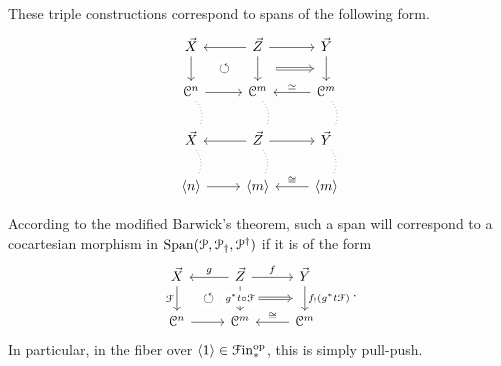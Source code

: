 \documentclass[main.tex]{subfiles}
\begin{document}
These triple constructions correspond to spans of the following form.
\begin{equation*}
  \begin{tikzcd}
    \vec{X}
    \arrow[d, ""{name=L, right}]
    & \vec{Z}
    \arrow[d, ""{name=ML, left}, ""{name=MR, right}]
    \arrow[r]
    \arrow[l]
    & \vec{Y}
    \arrow[d, ""{name=R, right}]
    \\
    \category{C}^{n}
    \arrow[d, no head, dotted, bend left]
    \arrow[r]
    & \category{C}^{m}
    \arrow[d, no head, dotted, bend left]
    & \category{C}^{m}
    \arrow[l, swap, "\simeq"]
    \arrow[d, no head, dotted, bend left]
    \\
    \vec{X}
    \arrow[d, no head, dotted, bend left]
    & \vec{Z}
    \arrow[d, no head, dotted, bend left]
    \arrow[r]
    \arrow[l]
    & \vec{Y}
    \arrow[d, no head, dotted, bend left]
    \\
    \langle n \rangle
    \arrow[r]
    & \langle m \rangle
    & \langle m \rangle
    \arrow[l, swap, "\cong"]
    \arrow[from=ML, to=L, phantom, shorten=1.5ex, "\circlearrowleft"{description}]
    \arrow[from=MR, to=R, Rightarrow, shorten=2ex]
  \end{tikzcd}
\end{equation*}

According to the modified Barwick's theorem, such a span will correspond to a cocartesian morphism in $\mathrm{Span}(\mathcal{P}, \mathcal{P}_{\dagger}, \mathcal{P}^{\dagger})$ if it is of the form
\begin{equation*}
  \begin{tikzcd}
    \vec{X}
    \arrow[d, "\mathcal{F}"{left}, ""{name=L, right}]
    & \vec{Z}
    \arrow[d, "g^{*}t \circ \mathcal{F}"{description}, ""{name=ML, left}, ""{name=MR, right}]
    \arrow[r, "f"]
    \arrow[l, swap, "g"]
    & \vec{Y}
    \arrow[d, ""{name=R, right}, "f_{!}(g^{*}t\mathcal{F})"]
    \\
    \category{C}^{n}
    \arrow[r]
    & \category{C}^{m}
    & \category{C}^{m}
    \arrow[l, swap, "\cong"]
    \arrow[from=ML, to=L, phantom, shorten=1.5ex, "\circlearrowleft"{description}]
    \arrow[from=MR, to=R, Rightarrow, shorten=2ex]
  \end{tikzcd}.
\end{equation*}
In particular, in the fiber over $\langle 1 \rangle \in \mathcal{F}\mathrm{in}_{*}^{\mathrm{op}}$, this is simply pull-push.
\end{document}
